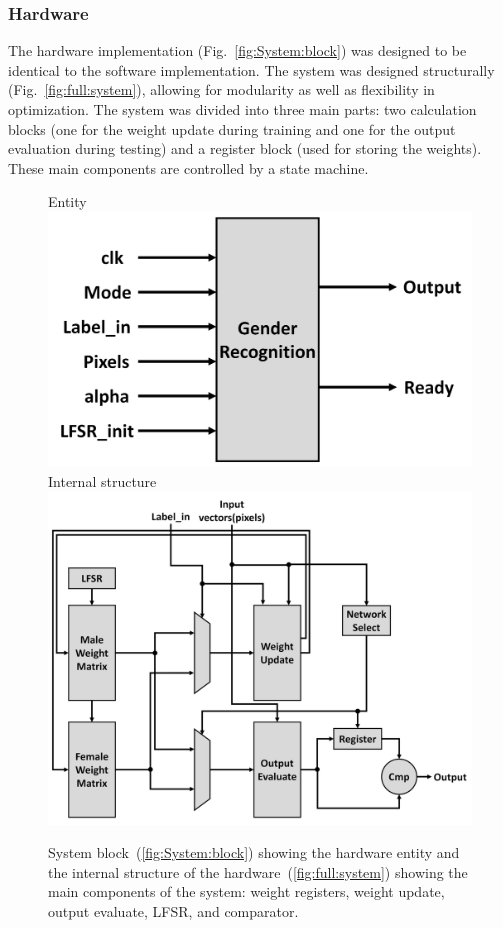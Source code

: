 \documentclass[10pt,journal]{IEEEtran}
\newcommand{\fig}[1]{Fig.~\ref{#1}}
\newcommand{\subfig}[1]{~(\ref{#1})}
\begin{document}
		\subsubsection{Hardware}
			The hardware implementation (\fig{fig:System:block}) was designed to be identical to the software implementation. The system was designed structurally (\fig{fig:full:system}), allowing for modularity as well as flexibility in optimization. The system was divided into three main parts: two calculation blocks (one for the weight update during training and one for the output evaluation during testing) and a register block (used for storing the weights). These main components are controlled by a state machine.
			
			\begin{figure}[h]
				\captionsetup[subfigure]{position=b}
				\centering
				\hfill
				\subcaptionbox
				{
					Entity
					\label{fig:System:block}
				}
				{\includegraphics[width=0.9\columnwidth]{System_block}}
				\hfill
				\subcaptionbox
				{
					Internal structure
					\label{fig:full:system}
				}
				{\includegraphics[width=0.9\columnwidth]{Full_system}}
				\hfill
				\caption{System block\subfig{fig:System:block} showing the hardware entity and the internal structure of the hardware\subfig{fig:full:system} showing the main components of the system: weight registers, weight update, output evaluate, LFSR, and comparator.}
				\label{fig:hardware:system}
			\end{figure}
			
\end{document}
